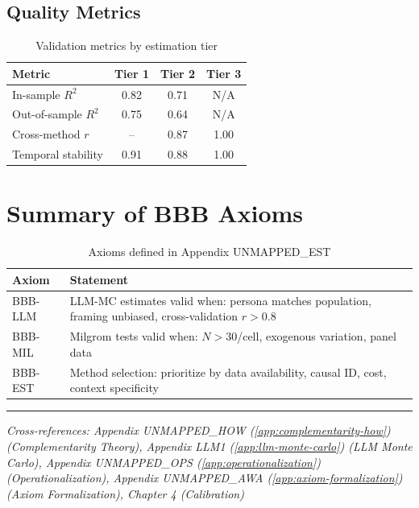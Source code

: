 \documentclass[11pt,a4paper]{article}
\theoremstyle{definition}
\begin{document}
\subsection{Quality Metrics}

\begin{table}[h]
\centering
\begin{tabular}{lccc}
\toprule
\textbf{Metric} & \textbf{Tier 1} & \textbf{Tier 2} & \textbf{Tier 3} \\
\midrule
In-sample $R^2$ & 0.82 & 0.71 & N/A \\
Out-of-sample $R^2$ & 0.75 & 0.64 & N/A \\
Cross-method $r$ & -- & 0.87 & 1.00 \\
Temporal stability & 0.91 & 0.88 & 1.00 \\
\bottomrule
\end{tabular}
\caption{Validation metrics by estimation tier}
\label{tab:validation}
\end{table}


\section{Summary of BBB Axioms}
\label{sec:bbb-axioms}

\begin{table}[h]
\centering
\begin{tabular}{lp{10cm}}
\toprule
\textbf{Axiom} & \textbf{Statement} \\
\midrule
BBB-LLM & LLM-MC estimates valid when: persona matches population, framing unbiased, cross-validation $r > 0.8$ \\
BBB-MIL & Milgrom tests valid when: $N > 30$/cell, exogenous variation, panel data \\
BBB-EST & Method selection: prioritize by data availability, causal ID, cost, context specificity \\
\bottomrule
\end{tabular}
\caption{Axioms defined in Appendix UNMAPPED_EST}
\label{tab:bbb-axioms}
\end{table}

\vspace{1em}
\hrule
\vspace{0.5em}
\noindent\textit{Cross-references: Appendix UNMAPPED_HOW (\ref{app:complementarity-how}) (Complementarity Theory), 
Appendix LLM1 (\ref{app:llm-monte-carlo}) (LLM Monte Carlo), Appendix UNMAPPED_OPS (\ref{app:operationalization}) (Operationalization), 
Appendix UNMAPPED_AWA (\ref{app:axiom-formalization}) (Axiom Formalization), Chapter 4 (Calibration)}
\end{document}
